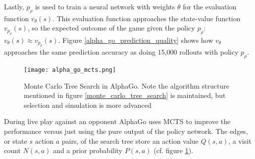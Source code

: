 Lastly, $p_{\rho}$ is used to train a neural network with weights $\theta$ for the evaluation function $v_{\theta}(s)$. This evaluation function approaches the state-value function $v_{p_{\rho}}(s)$, so the expected outcome of the game given the policy $p_{\rho}$: $v_{\theta}(s) \approx v_{p_{\rho}}(s)$. Figure \ref{alpha_go_prediction_quality} shows how $v_{\theta}$ approaches the same prediction accuracy as doing 15,000 rollouts with policy $p_{\rho}$.

\begin{figure}
    \centering
    \texttt{[image: alpha\_go\_mcts.png]}
    \caption{Monte Carlo Tree Search in AlphaGo. \cite{silver_mastering_2016} Note the algorithm structure mentioned in figure \ref{monte_carlo_tree_search} is maintained, but selection and simulation is more advanced}
    \label{alpha_go_mcts}
\end{figure}

During live play against an opponent AlphaGo uses MCTS to improve the performance versus just using the pure output of the policy network. The edges, or state $s$ action $a$ pairs, of the search tree store an action value $Q(s, a)$, a visit count $N(s, a)$ and a prior probability $P(s, a)$ (cf. figure \ref{alpha_go_mcts}).

